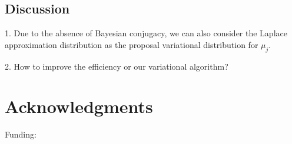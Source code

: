 \documentclass{article}
\begin{document}
\subsection{Discussion}
1. Due to the absence of Bayesian conjugacy, we can also consider the Laplace approximation distribution as the proposal variational distribution for $\mu_j$.

2. How to improve the efficiency or our variational algorithm?

\section*{Acknowledgments}
Funding:


\appendix



\end{document}
